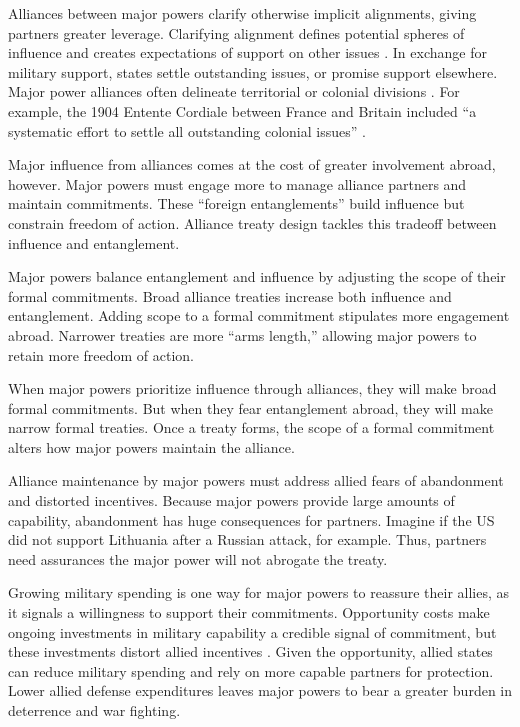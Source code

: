 \documentclass[12pt]{article}
\begin{document}
Alliances between major powers clarify otherwise implicit alignments, giving partners greater leverage. 
Clarifying alignment defines potential spheres of influence and creates expectations of support on other issues \citep{Snyder1997}. 
In exchange for military support, states settle outstanding issues, or promise support elsewhere. 
Major power alliances often delineate territorial or colonial divisions \cite{Langer1950, Kissinger1994}.
For example, the 1904 Entente Cordiale between France and Britain included ``a systematic effort to settle all outstanding colonial issues'' \citep[pg. 189]{Kissinger1994}.   


Major influence from alliances comes at the cost of greater involvement abroad, however.
Major powers must engage more to manage alliance partners and maintain commitments.
These ``foreign entanglements'' build influence but constrain freedom of action.
Alliance treaty design tackles this tradeoff between influence and entanglement. 


Major powers balance entanglement and influence by adjusting the scope of their formal commitments. 
Broad alliance treaties increase both influence and entanglement. 
Adding scope to a formal commitment stipulates more engagement abroad. 
Narrower treaties are more ``arms length,'' allowing major powers to retain more freedom of action. 


When major powers prioritize influence through alliances, they will make broad formal commitments.
But when they fear entanglement abroad, they will make narrow formal treaties. 
Once a treaty forms, the scope of a formal commitment alters how major powers maintain the alliance. 


Alliance maintenance by major powers must address allied fears of abandonment and distorted incentives. 
Because major powers provide large amounts of capability, abandonment has huge consequences for partners. 
Imagine if the US did not support Lithuania after a Russian attack, for example. 
Thus, partners need assurances the major power will not abrogate the treaty. 


Growing military spending is one way for major powers to reassure their allies, as it signals a willingness to support their commitments. 
Opportunity costs make ongoing investments in military capability a credible signal of commitment, but these investments distort allied incentives \citep{Lake1996, Lake2009}. 
Given the opportunity, allied states can reduce military spending and rely on more capable partners for protection.
Lower allied defense expenditures leaves major powers to bear a greater burden in deterrence and war fighting. 
\end{document}
